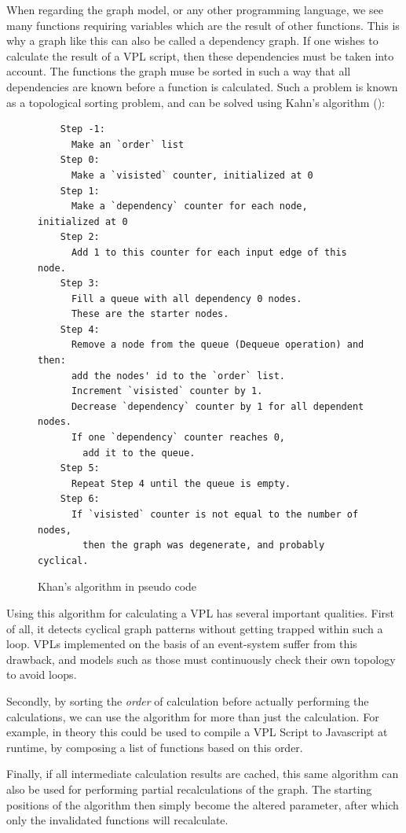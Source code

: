 When regarding the graph model, or any other programming language, we see many functions requiring variables which are the result of other functions. 
This is why a graph like this can also be called a dependency graph. 
If one wishes to calculate the result of a VPL script, then these dependencies must be taken into account. 
The functions the graph muse be sorted in such a way that all dependencies are known before a function is calculated.
Such a problem is known as a topological sorting problem, and can be solved using Kahn's algorithm (): 

\begin{figure}
  \centering
  \begin{lstlisting}
    Step -1: 
      Make an `order` list
    Step 0: 
      Make a `visisted` counter, initialized at 0
    Step 1: 
      Make a `dependency` counter for each node, initialized at 0
    Step 2: 
      Add 1 to this counter for each input edge of this node.
    Step 3: 
      Fill a queue with all dependency 0 nodes. 
      These are the starter nodes.
    Step 4: 
      Remove a node from the queue (Dequeue operation) and then:
      add the nodes' id to the `order` list.
      Increment `visisted` counter by 1.
      Decrease `dependency` counter by 1 for all dependent nodes.
      If one `dependency` counter reaches 0, 
        add it to the queue.
    Step 5: 
      Repeat Step 4 until the queue is empty.
    Step 6: 
      If `visisted` counter is not equal to the number of nodes, 
        then the graph was degenerate, and probably cyclical. 
    \end{lstlisting}
  \caption[Kahns algorithm]{Khan's algorithm in pseudo code}
  \label{fig:kahn}
\end{figure}

Using this algorithm for calculating a VPL has several important qualities. 
First of all, it detects cyclical graph patterns without getting trapped within such a loop. 
VPLs implemented on the basis of an event-system suffer from this drawback, and models such as those must continuously check their own topology to avoid loops. 

Secondly, by sorting the \emph{order} of calculation before actually performing the calculations, we can use the algorithm for more than just the calculation.
For example, in theory this could be used to compile a VPL Script to Javascript at runtime, by composing a list of functions based on this order. 

Finally, if all intermediate calculation results are cached, this same algorithm can also be used for performing partial recalculations of the graph. 
The starting positions of the algorithm then simply become the altered parameter, after which only the invalidated functions will recalculate. 

